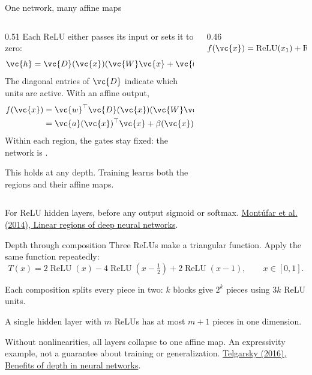\begin{frame}{One network, many affine maps}
  \small
  \setlength{\abovedisplayskip}{6pt}\setlength{\belowdisplayskip}{6pt}
  \begin{columns}[c,onlytextwidth]
    \begin{column}{0.51\textwidth}
      Each ReLU either passes its input or sets it to zero:
      \[
        \vc{h}=\vc{D}(\vc{x})(\vc{W}\vc{x}+\vc{b}),
        \qquad D_{ii}(\vc{x})\in\{0,1\}.
      \]
      The diagonal entries of $\vc{D}$ indicate which units are active. With an affine output,
      \begin{align*}
        f(\vc{x})&=\vc{w}^{\top}\vc{D}(\vc{x})(\vc{W}\vc{x}+\vc{b})+c\\
                 &=\vc{a}(\vc{x})^{\top}\vc{x}+\beta(\vc{x}).
      \end{align*}
      Within each region, the gates stay fixed: the network is .

      \medskip
      This holds at any depth. Training learns both the regions and their affine maps.
    \end{column}
    \begin{column}{0.46\textwidth}
      \centering
      $f(\vc{x})=\operatorname{ReLU}(x_1)+\operatorname{ReLU}(x_2-x_1)$\par
      \smallskip
      
    \end{column}
  \end{columns}
  \vfill
  {\scriptsize\color{drawgray}For ReLU hidden layers, before any output sigmoid or softmax.
  \href{https://arxiv.org/abs/1402.1869}{Mont\'ufar et al. (2014), Linear regions of deep neural networks}.}
\end{frame}

\begin{frame}{Depth through composition}
  \small
  \setlength{\abovedisplayskip}{5pt}\setlength{\belowdisplayskip}{5pt}
  Three ReLUs make a triangular function. Apply the same function repeatedly:
  \[
    T(x)=2\operatorname{ReLU}(x)-4\operatorname{ReLU}\!\left(x-\tfrac12\right)
         +2\operatorname{ReLU}(x-1),\qquad x\in[0,1].
  \]
  \begin{center}
    
  \end{center}
  Each composition splits every piece in two: $k$ blocks give $2^k$ pieces using $3k$ ReLU units.

  \smallskip
  A single hidden layer with $m$ ReLUs has at most $m+1$ pieces in one dimension.

  \smallskip
  Without nonlinearities, all layers collapse to one affine map.
  \vfill
  {\scriptsize\color{drawgray}An expressivity example, not a guarantee about training or generalization.
  \href{https://proceedings.mlr.press/v49/telgarsky16.html}{Telgarsky (2016), Benefits of depth in neural networks}.}
\end{frame}
